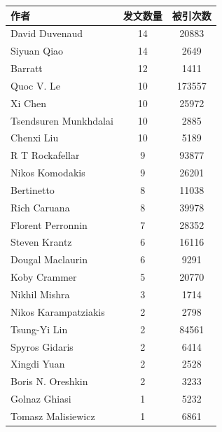 \begin{table}[htbp]
    \centering
        \begin{tabular}{lcc}
        \hline
        \textbf{作者}             & \multicolumn{1}{l}{\textbf{发文数量}} & \textbf{被引次数} \\ \hline
        David   Duvenaud        & 14                                & 20883         \\
        Siyuan   Qiao           & 14                                & 2649          \\
        Barratt                 & 12                                & 1411          \\
        Quoc   V. Le            & 10                                & 173557        \\
        Xi   Chen               & 10                                & 25972         \\
        Tsendsuren   Munkhdalai & 10                                & 2885          \\
        Chenxi   Liu            & 10                                & 5189          \\
        R   T Rockafellar       & 9                                 & 93877         \\
        Nikos   Komodakis       & 9                                 & 26201         \\
        Bertinetto              & 8                                 & 11038         \\
        Rich   Caruana          & 8                                 & 39978         \\
        Florent   Perronnin     & 7                                 & 28352         \\
        Steven   Krantz         & 6                                 & 16116         \\
        Dougal   Maclaurin      & 6                                 & 9291          \\
        Koby   Crammer          & 5                                 & 20770         \\
        Nikhil   Mishra         & 3                                 & 1714          \\
        Nikos   Karampatziakis  & 2                                 & 2798          \\
        Tsung-Yi   Lin          & 2                                 & 84561         \\
        Spyros   Gidaris        & 2                                 & 6414          \\
        Xingdi   Yuan           & 2                                 & 2528          \\
        Boris   N. Oreshkin     & 2                                 & 3233          \\
        Golnaz   Ghiasi         & 1                                 & 5232          \\
        Tomasz   Malisiewicz    & 1                                 & 6861          \\ \hline
        \end{tabular}
    

\end{table}
